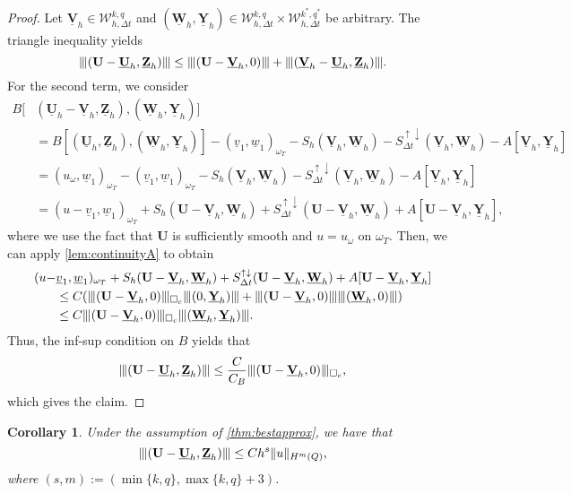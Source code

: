 \documentclass[sn-mathphys-num]{sn-jnl}
\newtheorem{cor}[thm]{Corollary}
\numberwithin{equation}{section}
\newcommand{\wop}{\square_c}
\newcommand{\tnorm}[1]{\vert\hspace{-0.3mm}\Vert#1\Vert\hspace{-0.3mm}\vert}
\newcommand{\ProdFullyDiscrSpace}[2]{ \mathcal{W}^{ {#1},{#2}}_{h, \Delta t  } }
\newcommand{\Uh}{\underline{\mathbf{U}}_h}
\newcommand{\Vh}{\underline{\mathbf{V}}_h}
\newcommand{\Yh}{\underline{\mathbf{Y}}_h}
\newcommand{\Zh}{\underline{\mathbf{Z}}_h}
\newcommand{\Wh}{\underline{\mathbf{W}}_h}
\newcommand{\Sud}{S^{\uparrow \downarrow}_{\Delta t}}
\begin{document}
\begin{proof}
    Let $\Vh \in \ProdFullyDiscrSpace{k}{q}$  and $(\Wh,\Yh) \in \ProdFullyDiscrSpace{k}{q} \times \ProdFullyDiscrSpace{k^\ast}{q^\ast}$ be arbitrary. The triangle inequality yields 
    \begin{equation*}
        \tnorm{(\mathbf{U} - \Uh,\Zh)} \le \tnorm{(\mathbf{U} - \Vh,0)} + \tnorm{(\Vh - \Uh,\Zh)}.
    \end{equation*}
    For the second term, we consider
    \begin{align*}
        B[&(\Uh - \Vh, \Zh),( \Wh, \Yh)] \\
        &= B[(\Uh,\Zh),( \Wh, \Yh)] - (\underline{v}_1, \underline{w}_1)_{\omega_T} - S_h(\Vh,\Wh) - \Sud(\Vh,\Wh) - A[\Vh,\Yh] \\
        &= (u_{\omega}, \underline{w}_1)_{\omega_T} - (\underline{v}_1, \underline{w}_1)_{\omega_T} - S_h(\Vh,\Wh) - \Sud(\Vh,\Wh) - A[\Vh,\Yh] \\
        &= (u - \underline{v}_1, \underline{w}_1)_{\omega_T}  +  S_h(\mathbf{U} - \Vh,\Wh) + \Sud(\mathbf{U} - \Vh,\Wh) + A[\mathbf{U} - \Vh,\Yh],
    \end{align*} 
    where we use the fact that $\mathbf{U}$ is sufficiently smooth and $u = u_{\omega}$ on $\omega_T$. Then, we can apply \cref{lem:continuityA} to obtain 
    \begin{align*}
        (u - &\underline{v}_1, \underline{w}_1)_{\omega_T}  +  S_h(\mathbf{U} - \Vh,\Wh) + \Sud(\mathbf{U} - \Vh,\Wh) + A[\mathbf{U} - \Vh,\Yh] \\
        &\le C(\tnorm{(\mathbf{U} - \Vh,0)}_{\wop} \tnorm{(0,\Yh)}  + \tnorm{(\mathbf{U} - \Vh,0)} \tnorm{(\Wh,0)} ) \\
        &\le C \tnorm{(\mathbf{U} - \Vh,0)}_{\wop} \tnorm{(\Wh,\Yh)}.
    \end{align*}
    Thus, the inf-sup condition on $B$ yields that 
    \begin{equation*}
    \tnorm{(\mathbf{U} - \Uh,\Zh)} \le \frac{C}{C_B} \tnorm{(\mathbf{U} - \Vh, 0)}_{\wop},
    \end{equation*}
    which gives the claim. 
\end{proof}


\begin{cor}\label{cor:tnormConvRates}
    Under the assumption of \cref{thm:bestapprox}, we have that
    \begin{equation*}
        \tnorm{(\mathbf{U} - \Uh,\Zh)} \le C h^s \Vert u \Vert_{H^m(Q)},
    \end{equation*}
    where $(s,m) := (\min\{ k,q \}, \max\{k,q\}+3)$. 
\end{cor}
\end{document}
